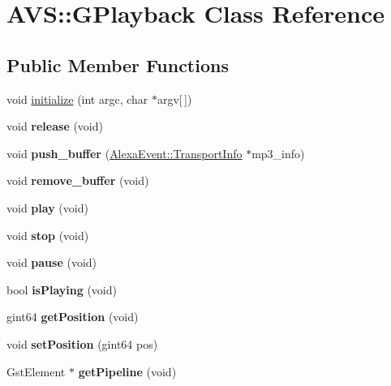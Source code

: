 \hypertarget{classAVS_1_1GPlayback}{}\section{A\+VS\+:\+:G\+Playback Class Reference}
\label{classAVS_1_1GPlayback}
\subsection*{Public Member Functions}
\begin{DoxyCompactItemize}
\item 
void \hyperlink{classAVS_1_1GPlayback_af831308af9bad387a1ac54e187166a0f}{initialize} (int argc, char $\ast$argv\mbox{[}$\,$\mbox{]})
\item 
\mbox{\label{classAVS_1_1GPlayback_aa1d713f76885384ec62aac6c7f8f1cfa}} 
void {\bfseries release} (void)
\item 
\mbox{\label{classAVS_1_1GPlayback_a641e61f15fbcd7ada474934a53ed4364}} 
void {\bfseries push\+\_\+buffer} (\hyperlink{classAlexaEvent_1_1TransportInfo}{Alexa\+Event\+::\+Transport\+Info} $\ast$mp3\+\_\+info)
\item 
\mbox{\label{classAVS_1_1GPlayback_a3dcc1bc51db522999a18bde63ae89928}} 
void {\bfseries remove\+\_\+buffer} (void)
\item 
\mbox{\label{classAVS_1_1GPlayback_a049384e93714247c36ac0a08c00dfaa8}} 
void {\bfseries play} (void)
\item 
\mbox{\label{classAVS_1_1GPlayback_a029f2a37672bede55ee4acddf74d77db}} 
void {\bfseries stop} (void)
\item 
\mbox{\label{classAVS_1_1GPlayback_aad35dd1a22e99170d9e90d30a80df57b}} 
void {\bfseries pause} (void)
\item 
\mbox{\label{classAVS_1_1GPlayback_ad91c413c91126c654d44fc4068b836be}} 
bool {\bfseries is\+Playing} (void)
\item 
\mbox{\label{classAVS_1_1GPlayback_a8a8d27b925d39009cede75d3a27d11de}} 
gint64 {\bfseries get\+Position} (void)
\item 
\mbox{\label{classAVS_1_1GPlayback_a745ae2ba25b4998d161a0aa08ac40fa3}} 
void {\bfseries set\+Position} (gint64 pos)
\item 
\mbox{\label{classAVS_1_1GPlayback_a3ceb4a0dfac5b6c4d106f998192e5167}} 
Gst\+Element $\ast$ {\bfseries get\+Pipeline} (void)
\end{DoxyCompactItemize}
